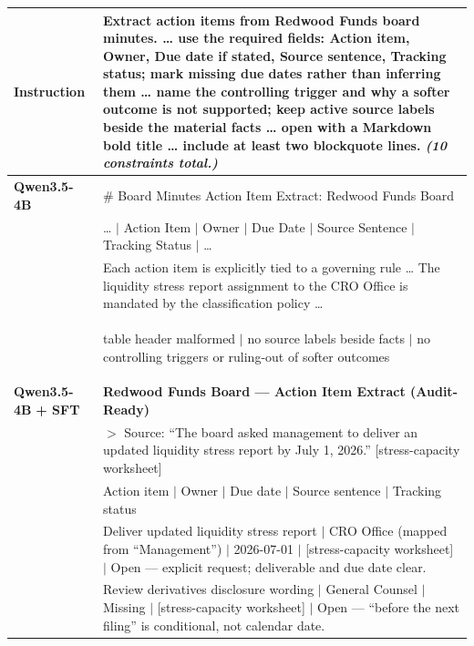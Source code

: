 \begin{table}[t]
\centering
\small
\renewcommand{\arraystretch}{1.15}
\begin{tabular}{p{2.2cm} p{12.8cm}}
\toprule
\textbf{Instruction} & Extract action items from Redwood Funds board minutes. \ldots{} \textbf{use the required fields: Action item, Owner, Due date if stated, Source sentence, Tracking status}; mark missing due dates rather than inferring them \ldots{} \textbf{name the controlling trigger and why a softer outcome is not supported}; \textbf{keep active source labels beside the material facts} \ldots{} open with a Markdown bold title \ldots{} include at least two blockquote lines. \textit{(10 constraints total.)} \\
\midrule
\textbf{Qwen3.5-4B} & \# Board Minutes Action Item Extract: Redwood Funds Board \\
& \ldots{} $|$ Action Item $|$ Owner $|$ Due Date $|$ Source Sentence $|$ Tracking Status $|$ \ldots{} \\
& Each action item is explicitly tied to a governing rule \ldots{} The liquidity stress report assignment to the CRO Office is mandated by the classification policy \ldots{} \\
& \colorbox{red!10}{\parbox{12.2cm}{\small\textsf{table header malformed $\mid$ no source labels beside facts $\mid$ no controlling triggers or ruling-out of softer outcomes}}} \\
\midrule
\textbf{Qwen3.5-4B} \newline \textbf{+ SFT} & \textbf{Redwood Funds Board --- Action Item Extract (Audit-Ready)} \\[2pt]
& $>$ Source: ``The board asked management to deliver an updated liquidity stress report by July 1, 2026.'' [stress-capacity worksheet] \\
& Action item $|$ Owner $|$ Due date $|$ Source sentence $|$ Tracking status \\
& Deliver updated liquidity stress report $|$ CRO Office (mapped from ``Management'') $|$ 2026-07-01 $|$ [stress-capacity worksheet] $|$ Open --- explicit request; deliverable and due date clear. \\
& Review derivatives disclosure wording $|$ General Counsel $|$ Missing $|$ [stress-capacity worksheet] $|$ Open --- ``before the next filing'' is conditional, not calendar date. \\

\end{tabular}
\end{table}
